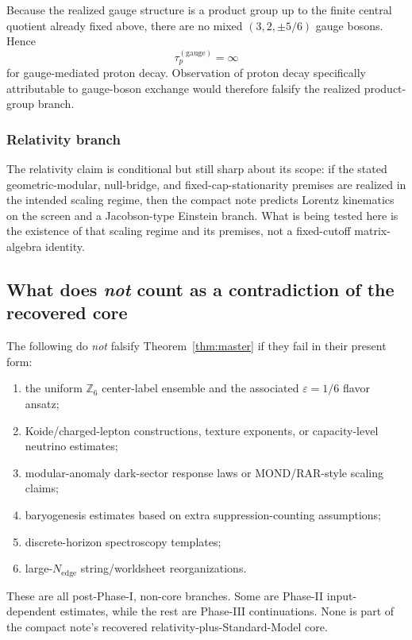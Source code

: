 \documentclass[11pt]{article}
\begin{document}
Because the realized gauge structure is a product group up to the finite central quotient already fixed above, there are no mixed \((3,2,\pm 5/6)\) gauge bosons. Hence
\[
\tau_p^{(\mathrm{gauge})}=\infty
\]
for gauge-mediated proton decay. Observation of proton decay specifically attributable to gauge-boson exchange would therefore falsify the realized product-group branch.

\subsubsection{Relativity branch}

The relativity claim is conditional but still sharp about its scope: if the stated geometric-modular, null-bridge, and fixed-cap-stationarity premises are realized in the intended scaling regime, then the compact note predicts Lorentz kinematics on the screen and a Jacobson-type Einstein branch. What is being tested here is the existence of that scaling regime and its premises, not a fixed-cutoff matrix-algebra identity.

\subsection{What does \emph{not} count as a contradiction of the recovered core}

The following do \emph{not} falsify Theorem~\ref{thm:master} if they fail in their present form:
\begin{enumerate}[leftmargin=2em]
\item the uniform $\mathbb Z_6$ center-label ensemble and the associated $\varepsilon=1/6$ flavor ansatz;
\item Koide/charged-lepton constructions, texture exponents, or capacity-level neutrino estimates;
\item modular-anomaly dark-sector response laws or MOND/RAR-style scaling claims;
\item baryogenesis estimates based on extra suppression-counting assumptions;
\item discrete-horizon spectroscopy templates;
\item large-$N_{\mathrm{edge}}$ string/worldsheet reorganizations.
\end{enumerate}
These are all post-Phase-I, non-core branches. Some are Phase-II input-dependent estimates, while the rest are Phase-III continuations. None is part of the compact note's recovered relativity-plus-Standard-Model core.
\end{document}
